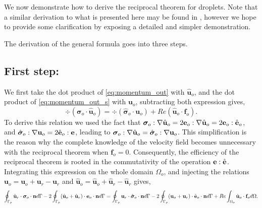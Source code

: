 We now demonstrate how to derive the reciprocal theorem for droplets.
Note that a similar derivation to what is presented here may be found in \citet{lovalenti1993force,raja2010inertial}, however we hope to provide some clarification by exposing a detailed and simpler demonstration.  

The derivation of the general formula goes into three steps. 

\subsection{First step:}
We first take the dot product of \ref{eq:momentum_out} with $\hat{\textbf{u}}_{o}$, and the dot product of \ref{eq:momentum_out_s} with $\textbf{u}_{o}$, subtracting both expression gives, 
\begin{equation}
    \div (\bm\sigma_{o}\cdot \hat{\textbf{u}}_o)
    =
    \div (\hat{\bm\sigma}_{o}\cdot \textbf{u}_o)
    + Re (\hat{\textbf{u}}_{o}\cdot \textbf{f}_{o}). 
    \label{eq:first_step_out}
\end{equation}
To derive this relation we used the fact that $\bm\sigma_o :\mathbf{\nabla} \hat{\textbf{u}}_o = 2\textbf{e}_o :\mathbf{\nabla} \hat{\textbf{u}}_o = 2{\textbf e}_o : \hat{\textbf e}_o$, and  $\hat{\bm\sigma}_o :\mathbf{\nabla} {\textbf{u}}_o = 2\hat{\textbf{e}}_o : \textbf{e}$, leading to $\bm\sigma_o :\mathbf{\nabla} \hat{\textbf{u}}_o = \hat{\bm\sigma}_o :\mathbf{\nabla} {\textbf{u}}_o$. 
This simplification is the reason why the complete knowledge of the velocity field becomes unnecessary with the reciprocal theorem when $\textbf{f}_o = 0$.
Consequently, the  efficiency of the reciprocal theorem is rooted in the commutativity of the operation $\textbf e:\hat{\textbf e}$. 
Integrating this expression on the whole domain $\Omega_{o}$, and injecting the relations $\textbf{u}_o = \textbf{u}_o+\textbf{u}_r-\textbf{u}_r$ and $\hat{\textbf{u}}_o = \hat{\textbf{u}}_o+\hat{\textbf{u}}_r-\hat{\textbf{u}}_r$ gives, 
\begin{equation}
    \intS[p]{\hat{\textbf{u}}_{r} \cdot  \bm\sigma_{o}\cdot \textbf{n}}
    - 2\intS[p]{(\hat{\textbf{u}}_{o} + \hat{\textbf{u}}_r) \cdot  \textbf e_{o}\cdot \textbf{n}}
    =
    \intS[p]{\textbf{u}_{r}\cdot \hat{\bm\sigma}_{o}\cdot \textbf{n}}
    - 2\intS[p]{(\textbf{u}_{o} + \textbf{u}_r)\cdot \hat{\textbf e}_{o}\cdot \textbf{n}}
    + 
    Re\intO[o]{\hat{\textbf{u}}_{o}\cdot \textbf{f}_{o}}.
    \label{eq:int_first_step}
\end{equation}
